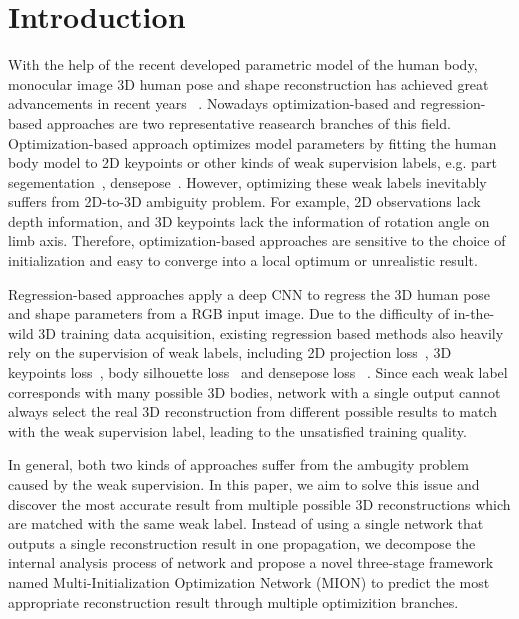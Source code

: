 \documentclass[sigconf]{acmart}
\begin{document}
\section{Introduction}
With the help of the recent developed parametric model of the human body, monocular image 3D human pose and shape reconstruction has achieved great advancements in recent years
~\cite{carion2020end, omran2018neural, kolotouros2019learning, kolotouros2019convolutional}. 
Nowadays optimization-based and regression-based approaches are two representative 
reasearch branches of this field. Optimization-based approach optimizes model parameters by 
fitting the human body model to 2D keypoints or other kinds of weak supervision labels, e.g. part segementation~\cite{yang2020renovating}, densepose~\cite{guler2018densepose, yang2019parsing}. However,  
optimizing these weak labels inevitably suffers from 2D-to-3D ambiguity problem. 
For example, 2D observations lack depth information, 
and 3D keypoints lack the information of rotation angle on limb axis. Therefore, optimization-based approaches 
are sensitive to the choice of initialization and easy to converge into a local optimum or unrealistic result. 

Regression-based approaches apply a deep CNN to regress 
the 3D human pose and shape parameters from a RGB input image. Due to the difficulty of in-the-wild 
3D training data acquisition, existing regression based methods also heavily rely on the supervision of weak 
labels, including 2D projection loss~\cite{lin2014microsoft}, 
3D keypoints loss~\cite{ionescu2013human3}, body silhouette loss~\cite{yao2019densebody} and densepose loss
~\cite{rong2019delving}. Since each weak label corresponds with many possible 3D bodies, 
network with a single output cannot 
always select the real 3D reconstruction from different possible results to match with the weak 
supervision label, leading to the unsatisfied training quality.

In general, both two kinds of approaches suffer from the ambugity problem caused by the weak supervision. 
In this paper, we aim to solve this issue and discover the most 
accurate result from multiple possible 3D reconstructions which are matched with the same weak label.   
Instead of using a single network that outputs a single reconstruction result in one propagation, 
we decompose the internal analysis process of network and propose a novel three-stage framework named 
Multi-Initialization Optimization Network (MION) to predict the most appropriate reconstruction 
result through multiple optimizition branches. 
\end{document}
